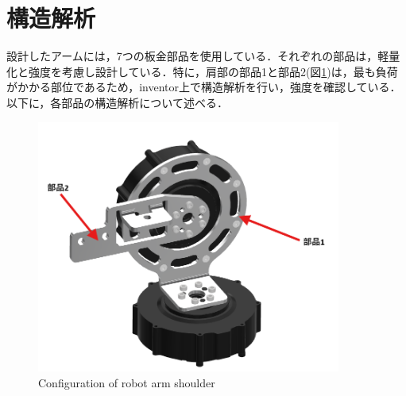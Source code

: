 \section{構造解析}
設計したアームには，7つの板金部品を使用している．それぞれの部品は，軽量化と強度を考慮し設計している．特に，肩部の部品1と部品2(図\ref{fig:shoulder})は，最も負荷がかかる部位であるため，inventor上で構造解析を行い，強度を確認している．以下に，各部品の構造解析について述べる．
\begin{figure}[h]
  \centering
  \includegraphics[width=10cm]{images/design/shoulder.png}
  \caption{Configuration of robot arm shoulder}
  \label{fig:shoulder}
\end{figure}
\clearpage
